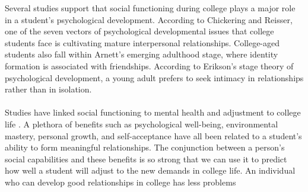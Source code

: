 \documentclass[journal]{./IEEE/IEEEtran}
\begin{document}
Several studies support that social functioning during college plays a major role in a student's psychological development. According to Chickering and Reisser, one of the seven vectors of psychological developmental issues that college students face is cultivating mature interpersonal relationships\cite{chickering}. College-aged students also fall within Arnett's emerging adulthood stage, where identity formation is associated with friendships\cite{erb}. According to Erikson's stage theory of psychological development, a young adult prefers to seek intimacy in relationships rather than in isolation\cite{erikson}.
\\
\\
\indent Studies have linked social functioning to mental health and adjustment to college life \cite{erb}. A plethora of benefits such as psychological well-being, environmental mastery, personal growth, and self-acceptance have all been related to a student's ability to form meaningful relationships\cite{erb}. The conjunction between a person’s social capabilities and these benefits is so strong that we can use it to predict how well a student  will adjust to the new demands in college life. An individual who can develop good relationships in college has less problems
\end{document}

